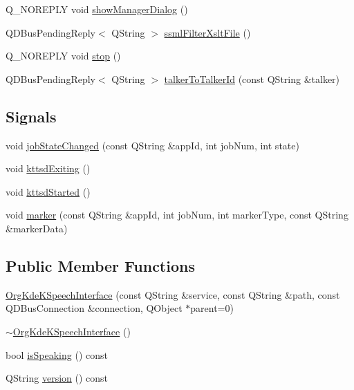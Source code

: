 \begin{DoxyCompactItemize}
Q\+\_\+\+N\+O\+R\+E\+P\+L\+Y void \hyperlink{classOrgKdeKSpeechInterface_acc07229033b543b0f85496464c81db66}{show\+Manager\+Dialog} ()
\item 
Q\+D\+Bus\+Pending\+Reply$<$ Q\+String $>$ \hyperlink{classOrgKdeKSpeechInterface_ab1571d8f688864b0e7f7ecc8929d7010}{ssml\+Filter\+Xslt\+File} ()
\item 
Q\+\_\+\+N\+O\+R\+E\+P\+L\+Y void \hyperlink{classOrgKdeKSpeechInterface_acedbe896ceccdb6164aa3881e993f49b}{stop} ()
\item 
Q\+D\+Bus\+Pending\+Reply$<$ Q\+String $>$ \hyperlink{classOrgKdeKSpeechInterface_a74c1ac0463284358e2e0c3da3414939a}{talker\+To\+Talker\+Id} (const Q\+String \&talker)
\end{DoxyCompactItemize}
\subsection*{Signals}
\begin{DoxyCompactItemize}
\item 
void \hyperlink{classOrgKdeKSpeechInterface_a6bde855843756650e2436cb591cbb88c}{job\+State\+Changed} (const Q\+String \&app\+Id, int job\+Num, int state)
\item 
void \hyperlink{classOrgKdeKSpeechInterface_a37d1995a8ae8f5e0870512d8de6668be}{kttsd\+Exiting} ()
\item 
void \hyperlink{classOrgKdeKSpeechInterface_a49669feb1ad5dabc7257665ad73a6e33}{kttsd\+Started} ()
\item 
void \hyperlink{classOrgKdeKSpeechInterface_a3b14cd261a71dee27fff44bddaecc4f2}{marker} (const Q\+String \&app\+Id, int job\+Num, int marker\+Type, const Q\+String \&marker\+Data)
\end{DoxyCompactItemize}
\subsection*{Public Member Functions}
\begin{DoxyCompactItemize}
\item 
\hyperlink{classOrgKdeKSpeechInterface_a3651a54637344a8c2885a781d488cb87}{Org\+Kde\+K\+Speech\+Interface} (const Q\+String \&service, const Q\+String \&path, const Q\+D\+Bus\+Connection \&connection, Q\+Object $\ast$parent=0)
\item 
\hyperlink{classOrgKdeKSpeechInterface_a9906d1a9e909b6c8784bf32664c4e740}{$\sim$\+Org\+Kde\+K\+Speech\+Interface} ()
\item 
bool \hyperlink{classOrgKdeKSpeechInterface_abf9d871079d85432168f9f386f53a638}{is\+Speaking} () const 
\item 
Q\+String \hyperlink{classOrgKdeKSpeechInterface_aa6923a35cfdd0bd52d272182a55b7f23}{version} () const 
\end{DoxyCompactItemize}
